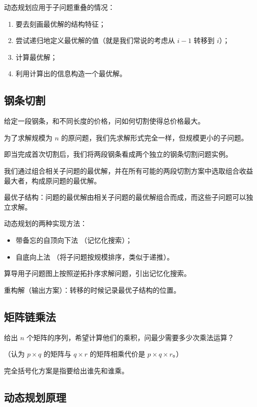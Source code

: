 
动态规划应用于子问题重叠的情况：

\begin{enumerate}
\item 要去刻画最优解的结构特征；
\item 尝试递归地定义最优解的值（就是我们常说的考虑从 $i - 1$ 转移到 $i$）；
\item 计算最优解；
\item 利用计算出的信息构造一个最优解。
\end{enumerate}

\subsection{钢条切割}

给定一段钢条，和不同长度的价格，问如何切割使得总价格最大。

为了求解规模为 $n$ 的原问题，我们先求解形式完全一样，但规模更小的子问题。

即当完成首次切割后，我们将两段钢条看成两个独立的钢条切割问题实例。

我们通过组合相关子问题的最优解，并在所有可能的两段切割方案中选取组合收益最大者，构成原问题的最优解。

\begin{QUOTE}{}{}
最优子结构：问题的最优解由相关子问题的最优解组合而成，而这些子问题可以独立求解。
\end{QUOTE}

动态规划的两种实现方法：

\begin{itemize}
\item 带备忘的自顶向下法 （记忆化搜索）；
\item 自底向上法 （将子问题按规模排序，类似于递推）。
\end{itemize}

算导用子问题图上按照逆拓扑序求解问题，引出记忆化搜索。

重构解（输出方案）：转移的时候记录最优子结构的位置。

\subsection{矩阵链乘法}

给出 $n$ 个矩阵的序列，希望计算他们的乘积，问最少需要多少次乘法运算？

（认为 $p \times q$ 的矩阵与 $q\times r$ 的矩阵相乘代价是 $p\times q\times r$。）

完全括号化方案是指要给出谁先和谁乘。

\subsection{动态规划原理}

